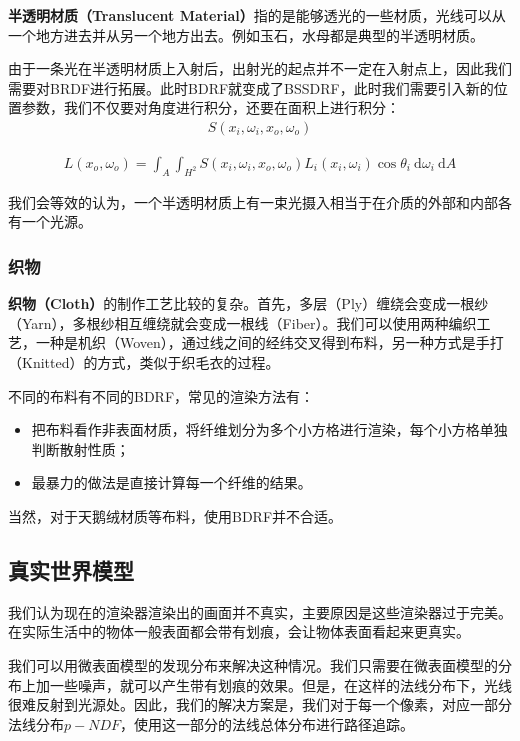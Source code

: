 \documentclass[openany]{progbookcn}
\begin{document}
\textbf{半透明材质（Translucent Material）}指的是能够透光的一些材质，光线可以从一个地方进去并从另一个地方出去。例如玉石，水母都是典型的半透明材质。

由于一条光在半透明材质上入射后，出射光的起点并不一定在入射点上，因此我们需要对BRDF进行拓展。此时BDRF就变成了BSSDRF，此时我们需要引入新的位置参数，我们不仅要对角度进行积分，还要在面积上进行积分：
\begin{eqnarray}
	S(x_i,\omega_i,x_o,\omega_o)
\end{eqnarray}

\begin{eqnarray}
	L\left(x_{o}, \omega_{o}\right)=\int_{A} \int_{H^{2}} S\left(x_{i}, \omega_{i}, x_{o}, \omega_{o}\right) L_{i}\left(x_{i}, \omega_{i}\right) \cos \theta_{i} \mathrm{~d} \omega_{i} \mathrm{~d} A
\end{eqnarray}

我们会等效的认为，一个半透明材质上有一束光摄入相当于在介质的外部和内部各有一个光源。

\subsubsection{织物}

\textbf{织物（Cloth）}的制作工艺比较的复杂。首先，多层（Ply）缠绕会变成一根纱（Yarn），多根纱相互缠绕就会变成一根线（Fiber）。我们可以使用两种编织工艺，一种是机织（Woven），通过线之间的经纬交叉得到布料，另一种方式是手打（Knitted）的方式，类似于织毛衣的过程。

不同的布料有不同的BDRF，常见的渲染方法有：
\begin{itemize}
	\item 把布料看作非表面材质，将纤维划分为多个小方格进行渲染，每个小方格单独判断散射性质；
	\item 最暴力的做法是直接计算每一个纤维的结果。
\end{itemize}

当然，对于天鹅绒材质等布料，使用BDRF并不合适。

\subsection{真实世界模型}

我们认为现在的渲染器渲染出的画面并不真实，主要原因是这些渲染器过于完美。在实际生活中的物体一般表面都会带有划痕，会让物体表面看起来更真实。

我们可以用微表面模型的发现分布来解决这种情况。我们只需要在微表面模型的分布上加一些噪声，就可以产生带有划痕的效果。但是，在这样的法线分布下，光线很难反射到光源处。因此，我们的解决方案是，我们对于每一个像素，对应一部分法线分布$p-NDF$，使用这一部分的法线总体分布进行路径追踪。
\end{document}
